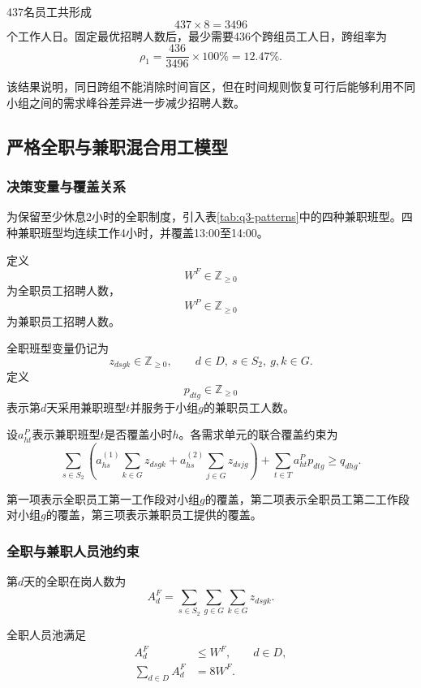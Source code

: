 \documentclass[withoutpreface,bwprint]{cumcmthesis}
\begin{document}
437名员工共形成
\[
437\times8=3496
\]
个工作人日。固定最优招聘人数后，最少需要436个跨组员工人日，跨组率为
\begin{equation}
\rho_1
=
\frac{436}{3496}\times100\%
=
12.47\%.
\label{eq:q3-gap1-cross-rate}
\end{equation}

该结果说明，同日跨组不能消除时间盲区，但在时间规则恢复可行后能够利用不同小组之间的需求峰谷差异进一步减少招聘人数。

\subsection{严格全职与兼职混合用工模型}

\subsubsection{决策变量与覆盖关系}

为保留至少休息2小时的全职制度，引入表\ref{tab:q3-patterns}中的四种兼职班型。四种兼职班型均连续工作4小时，并覆盖13:00至14:00。

定义
\[
W^F\in\mathbb Z_{\geq0}
\]
为全职员工招聘人数，
\[
W^P\in\mathbb Z_{\geq0}
\]
为兼职员工招聘人数。

全职班型变量仍记为
\[
z_{dsgk}\in\mathbb Z_{\geq0},
\qquad
d\in D,\ s\in S_2,\ g,k\in G.
\]
定义
\[
p_{dtg}\in\mathbb Z_{\geq0}
\]
表示第$d$天采用兼职班型$t$并服务于小组$g$的兼职员工人数。

设$a^P_{ht}$表示兼职班型$t$是否覆盖小时$h$。各需求单元的联合覆盖约束为
\begin{equation}
\sum_{s\in S_2}
\left(
a^{(1)}_{hs}\sum_{k\in G}z_{dsgk}
+
a^{(2)}_{hs}\sum_{j\in G}z_{dsjg}
\right)
+
\sum_{t\in T}a^P_{ht}p_{dtg}
\geq q_{dhg}.
\label{eq:q3-mixed-cover}
\end{equation}

第一项表示全职员工第一工作段对小组$g$的覆盖，第二项表示全职员工第二工作段对小组$g$的覆盖，第三项表示兼职员工提供的覆盖。

\subsubsection{全职与兼职人员池约束}

第$d$天的全职在岗人数为
\begin{equation}
A_d^F
=
\sum_{s\in S_2}
\sum_{g\in G}
\sum_{k\in G}
z_{dsgk}.
\label{eq:q3-fulltime-daily}
\end{equation}

全职人员池满足
\begin{align}
A_d^F&\leq W^F,
&&d\in D,\label{eq:q3-fulltime-capacity}\\
\sum_{d\in D}A_d^F&=8W^F.
\label{eq:q3-fulltime-total}
\end{align}
\end{document}
